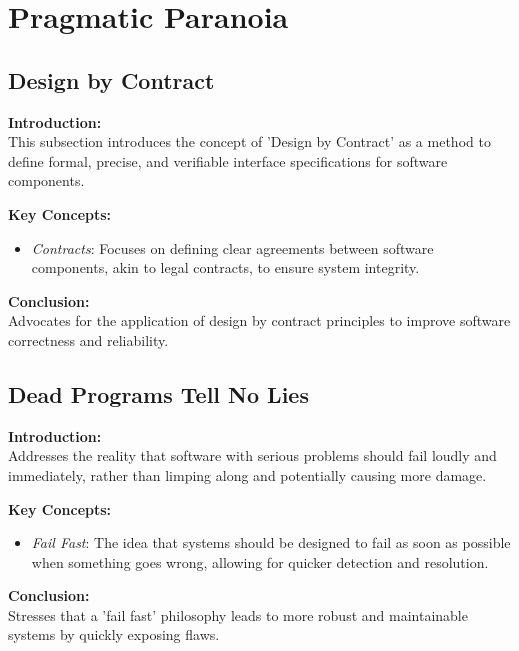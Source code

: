 \section{Pragmatic Paranoia}

\subsection{Design by Contract}

\textbf{Introduction:} \\
This subsection introduces the concept of 'Design by Contract' as a method to define formal, precise, and verifiable interface specifications for software components.

\vspace{2mm}
\noindent\textbf{Key Concepts:}
\begin{itemize}
  \item \textit{Contracts}: Focuses on defining clear agreements between software components, akin to legal contracts, to ensure system integrity.
\end{itemize}

\vspace{2mm}
\noindent\textbf{Conclusion:} \\
Advocates for the application of design by contract principles to improve software correctness and reliability.

\subsection{Dead Programs Tell No Lies}

\textbf{Introduction:} \\
Addresses the reality that software with serious problems should fail loudly and immediately, rather than limping along and potentially causing more damage.

\vspace{2mm}
\noindent\textbf{Key Concepts:}
\begin{itemize}
  \item \textit{Fail Fast}: The idea that systems should be designed to fail as soon as possible when something goes wrong, allowing for quicker detection and resolution.
\end{itemize}

\vspace{2mm}
\noindent\textbf{Conclusion:} \\
Stresses that a 'fail fast' philosophy leads to more robust and maintainable systems by quickly exposing flaws.

